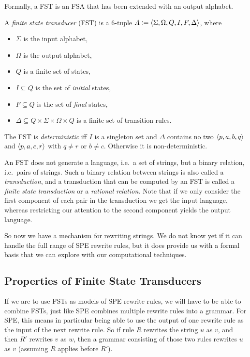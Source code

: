 Formally, a FST is an FSA that has been extended with an output alphabet.
%
\begin{definition}
    A \emph{finite state transducer} (FST) is a 6-tuple $A \mathrel{\mathop:}= \left \langle \Sigma, \Omega, Q, I, F, \Delta \right \rangle $, where
    \begin{itemize}
        \item $\Sigma$ is the input alphabet,
        \item $\Omega$ is the output alphabet,
        \item $Q$ is a finite set of states,
        \item $I \subseteq Q$ is the set of \emph{initial} states,
        \item $F \subseteq Q$ is the set of \emph{final} states,
        \item $\Delta \subseteq Q \times \Sigma \times \Omega \times Q$ is a finite set of transition rules.
    \end{itemize}
    The FST is \emph{deterministic} iff $I$ is a singleton set and $\Delta$ contains no two $\left \langle p,a,b,q \right \rangle $ and $\left \langle p,a,c,r \right \rangle $ with $q \neq r$ or $b \neq c$.
    Otherwise it is non-deterministic.
\end{definition}
%
An FST does not generate a language, i.e.\ a set of strings, but a binary relation, i.e.\ pairs of strings.
Such a binary relation between strings is also called a \emph{transduction}, and a transduction that can be computed by an FST is called a \emph{finite state transduction} or a \emph{rational relation}.
Note that if we only consider the first component of each pair in the transduction we get the input language, whereas restricting our attention to the second component yields the output language.

So now we have a mechanism for rewriting strings.
We do not know yet if it can handle the full range of SPE rewrite rules, but it does provide us with a formal basis that we can explore with our computational techniques.

\subsection{Properties of Finite State Transducers}

If we are to use FSTs as models of SPE rewrite rules, we will have to be able to combine FSTs, just like SPE combines multiple rewrite rules into a grammar.
For SPE, this means in particular being able to use the output of one rewrite rule as the input of the next rewrite rule.
So if rule $R$ rewrites the string $u$ as $v$, and then $R'$ rewrites $v$ as $w$, then a grammar consisting of those two rules rewrites $u$ as $v$ (assuming $R$ applies before $R'$).

